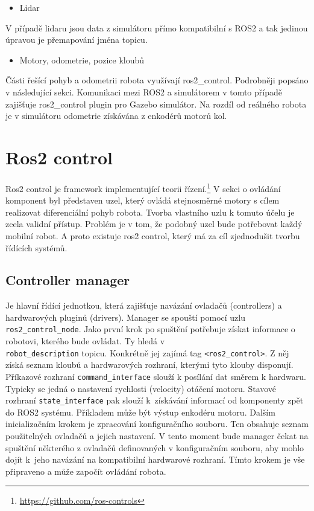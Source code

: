 \begin{itemize}[leftmargin=*]
	\item{Lidar}
\end{itemize}
\vspace*{-0.5em}
V případě lidaru jsou data z simulátoru přímo kompatibilní s ROS2 a tak jedinou úpravou je přemapování jména topicu.

\begin{itemize}[leftmargin=*]
	\item{Motory, odometrie, pozice kloubů}
\end{itemize}
\vspace*{-0.5em}
Části řešící pohyb a odometrii robota využívají ros2\_control. Podrobněji popsáno v následující sekci. Komunikaci mezi ROS2 a simulátorem v tomto případě zajišťuje ros2\_control plugin pro Gazebo simulátor. Na rozdíl od reálného robota je v simulátoru odometrie získávána z enkodérů motorů kol. 

\newpage
\section{Ros2 control}
Ros2 control je framework implementující teorii řízení.\footnote{\url{https://github.com/ros-controls}} V sekci o ovládání komponent byl představen uzel, který ovládá stejnosměrné motory s cílem realizovat diferenciální pohyb robota. Tvorba vlastního uzlu k tomuto účelu je zcela validní přístup. Problém je v tom, že podobný uzel bude potřebovat každý mobilní robot. A proto existuje ros2 control, který má za cíl zjednodušit tvorbu řídících systémů. \cite{ros2_control_documentation}

\subsection*{Controller manager}
Je hlavní řídící jednotkou, která zajišťuje navázání ovladačů (controllers) a hardwarových pluginů (drivers). Manager se spouští pomocí uzlu \verb|ros2_control_node|. Jako první krok po spuštění potřebuje získat informace o robotovi, kterého bude ovládat. Ty hledá v \\ \verb|robot_description| topicu. Konkrétně jej zajímá tag \verb|<ros2_control>|. Z něj získá seznam kloubů a hardwarových rozhraní, kterými tyto klouby disponují. Příkazové rozhraní \verb|command_interface| slouží k posílání dat směrem k hardwaru. Typicky se jedná o nastavení rychlosti (velocity) otáčení motoru. Stavové rozhraní \verb|state_interface| pak slouží k~získávání informací od komponenty zpět do ROS2 systému. Příkladem může být výstup enkodéru motoru. Dalším inicializačním krokem je zpracování konfiguračního souboru. Ten obsahuje seznam použitelných ovladačů a jejich nastavení. V tento moment bude manager čekat na spuštění některého z ovladačů definovaných v konfiguračním souboru, aby mohlo dojít k~jeho navázání na kompatibilní hardwarové rozhraní. Tímto krokem je vše připraveno a může započít ovládání robota. \cite{ros2_control_documentation} 

